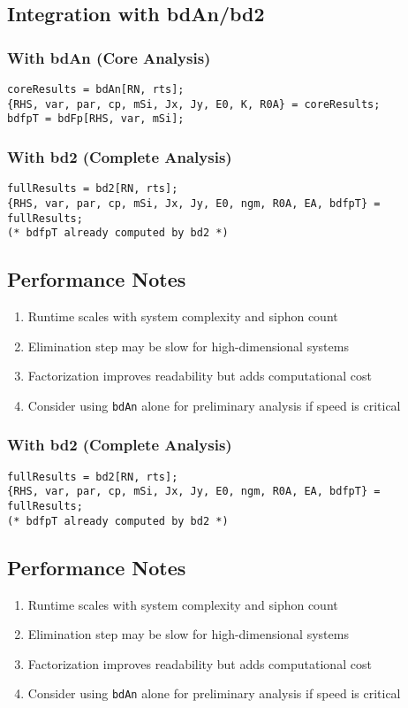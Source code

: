 \documentclass{article}
\begin{document}
\subsection{Integration with bdAn/bd2}

\subsubsection{With bdAn (Core Analysis)}
\begin{lstlisting}
coreResults = bdAn[RN, rts];
{RHS, var, par, cp, mSi, Jx, Jy, E0, K, R0A} = coreResults;
bdfpT = bdFp[RHS, var, mSi];
\end{lstlisting}

\subsubsection{With bd2 (Complete Analysis)}
\begin{lstlisting}
fullResults = bd2[RN, rts];
{RHS, var, par, cp, mSi, Jx, Jy, E0, ngm, R0A, EA, bdfpT} = fullResults;
(* bdfpT already computed by bd2 *)
\end{lstlisting}

\subsection{Performance Notes}
\begin{enumerate}
\item Runtime scales with system complexity and siphon count
\item Elimination step may be slow for high-dimensional systems
\item Factorization improves readability but adds computational cost
\item Consider using \texttt{bdAn} alone for preliminary analysis if speed is critical
\end{enumerate}
\subsubsection{With bd2 (Complete Analysis)}
\begin{lstlisting}
fullResults = bd2[RN, rts];
{RHS, var, par, cp, mSi, Jx, Jy, E0, ngm, R0A, EA, bdfpT} = fullResults;
(* bdfpT already computed by bd2 *)
\end{lstlisting}

\subsection{Performance Notes}
\begin{enumerate}
\item Runtime scales with system complexity and siphon count
\item Elimination step may be slow for high-dimensional systems
\item Factorization improves readability but adds computational cost
\item Consider using \texttt{bdAn} alone for preliminary analysis if speed is critical
\end{enumerate}
\end{document}
